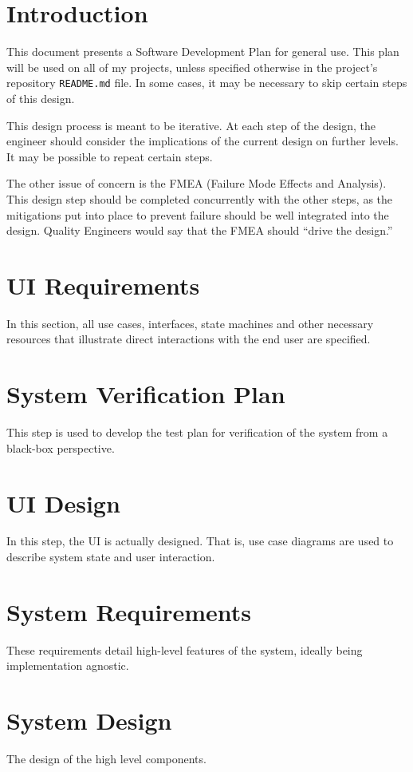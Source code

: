 \documentclass{designdoc}
\begin{document}
\section{Introduction}
This document presents a Software Development Plan for general use. This plan
will be used on all of my projects, unless specified otherwise in the project's
repository \texttt{README.md} file. In some cases, it may be necessary to skip
certain steps of this design.

This design process is meant to be iterative. At each step of the design, the
engineer should consider the implications of the current design on further
levels. It may be possible to repeat certain steps.

The other issue of concern is the FMEA (Failure Mode Effects and Analysis).
This design step should be completed concurrently with the other steps, as the
mitigations put into place to prevent failure should be well integrated into
the design. Quality Engineers would say that the FMEA should ``drive the
design.''

\section{UI Requirements}
In this section, all use cases, interfaces, state machines and other
necessary resources that illustrate direct interactions with the end user are
specified.

\section{System Verification Plan}
This step is used to develop the test plan for verification of the system from
a black-box perspective.

\section{UI Design}
In this step, the UI is actually designed. That is, use case diagrams are used
to describe system state and user interaction.

\section{System Requirements}
These requirements detail high-level features of the system, ideally being
implementation agnostic.

\section{System Design}
The design of the high level components.
\end{document}
